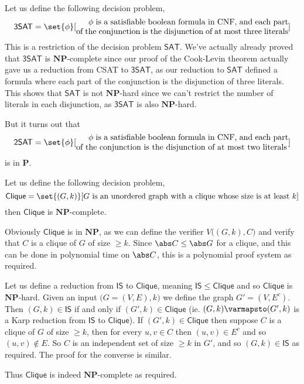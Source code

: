 \documentclass[10pt]{article}
\def\sat{\mathsf{SAT}}
\def\is{\mathsf{IS}}
\def\P{\mathbf{P}}
\def\NP{\mathbf{NP}}
\begin{document}


\bigskip

\def\threesat{\mathsf{3SAT}}
Let us define the following decision problem,
\[ \threesat = \set{\phi}[\vcenter{\advance\hsize by-3cm\relax $\phi$ is a satisfiable boolean formula in CNF, and each part of the conjunction is the disjunction of at most three literals}] \]
This is a restriction of the decision problem $\sat$.
We've actually already proved that $\threesat$ is $\NP$-complete since our proof of the Cook-Levin theorem actually gave us a reduction from CSAT to $\threesat$, as our reduction to $\sat$ defined a formula
where each part of the conjunction is the disjunction of three literals.
This shows that $\sat$ is not $\NP$-hard since we can't restrict the number of literals in each disjunction, as $\threesat$ is also $\NP$-hard.

But it turns out that
\[ \mathsf{2SAT} = \set{\phi}[\vcenter{\advance\hsize by-3cm\relax $\phi$ is a satisfiable boolean formula in CNF, and each part of the conjunction is the disjunction of at most two literals}] \]
is in $\P$.

\def\clique{\mathsf{Clique}}
\begin{exam*}

    Let us define the following decision problem,
    \[ \clique = \set{(G,k)}[\text{$G$ is an unordered graph with a clique whose size is at least $k$}] \]
    then $\clique$ is $\NP$-complete.

    Obviously $\clique$ is in $\NP$, as we can define the verifier $V\bigl((G,k),C\bigr)$ and verify that $C$ is a clique of $G$ of size $\geq k$.
    Since $\abs C\leq\abs G$ for a clique, and this can be done in polynomial time on $\abs C$, this is a polynomial proof system as required.

    Let us define a reduction from $\is$ to $\clique$, meaning $\is\leq\clique$ and so $\clique$ is $\NP$-hard.
    Given an input $\bigl(G=(V,E),k\bigr)$ we define the graph $G'=(V,E^c)$.
    Then $(G,k)\in\is$ if and only if $(G',k)\in\clique$ (ie. $(G,k)\varmapsto(G',k)$ is a Karp reduction from $\is$ to $\clique$).
    If $(G',k)\in\clique$ then suppose $C$ is a clique of $G$ of size $\geq k$, then for every $u,v\in C$ then $(u,v)\in E^c$ and so $(u,v)\notin E$.
    So $C$ is an independent set of size $\geq k$ in $G'$, and so $(G,k)\in\is$ as required.
    The proof for the converse is similar.

    Thus $\clique$ is indeed $\NP$-complete as required.

\end{exam*}
\end{document}
